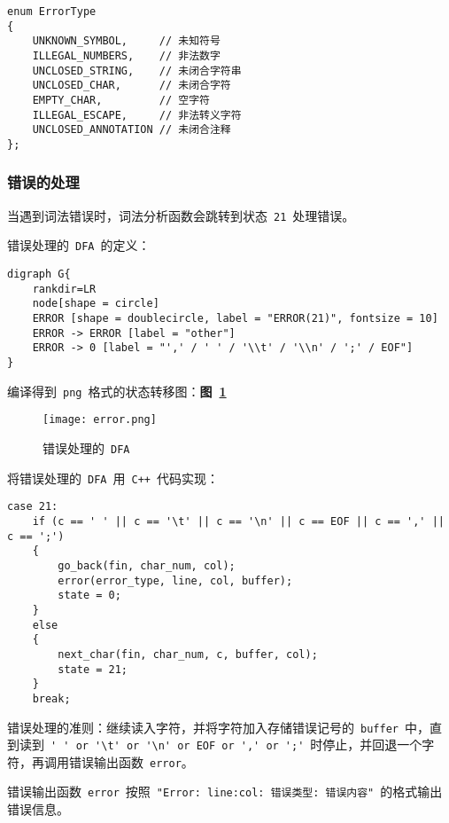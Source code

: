 \documentclass[lang=cn,11pt,a4paper]{paper}
\begin{document}
\begin{lstlisting}
enum ErrorType
{
    UNKNOWN_SYMBOL,     // 未知符号
    ILLEGAL_NUMBERS,    // 非法数字
    UNCLOSED_STRING,    // 未闭合字符串
    UNCLOSED_CHAR,      // 未闭合字符
    EMPTY_CHAR,         // 空字符
    ILLEGAL_ESCAPE,     // 非法转义字符
    UNCLOSED_ANNOTATION // 未闭合注释
};
\end{lstlisting}

\subsubsection{错误的处理}

当遇到词法错误时，词法分析函数会跳转到状态\ \lstinline{21}\ 处理错误。

错误处理的\ \lstinline{DFA}\ 的定义：
\begin{lstlisting}
digraph G{
    rankdir=LR
    node[shape = circle]
    ERROR [shape = doublecircle, label = "ERROR(21)", fontsize = 10]
    ERROR -> ERROR [label = "other"]
    ERROR -> 0 [label = "',' / ' ' / '\\t' / '\\n' / ';' / EOF"]
}
\end{lstlisting}

编译得到\ \lstinline{png}\ 格式的状态转移图：\textbf{图\ \ref{fig:错误处理的的DFA}}

\begin{figure}[!htb]
    \centering
    \texttt{[image: error.png]}
    \caption{错误处理的\ \lstinline{DFA}}
    \label{fig:错误处理的的DFA}
\end{figure}

将错误处理的\ \lstinline{DFA}\ 用\ \lstinline{C++}\ 代码实现：
\begin{lstlisting}
case 21:
    if (c == ' ' || c == '\t' || c == '\n' || c == EOF || c == ',' || c == ';')
    {
        go_back(fin, char_num, col);
        error(error_type, line, col, buffer);
        state = 0;
    }
    else
    {
        next_char(fin, char_num, c, buffer, col);
        state = 21;
    }
    break;
\end{lstlisting}

错误处理的准则：继续读入字符，并将字符加入存储错误记号的\ \lstinline{buffer}\ 中，直到读到\ \lstinline{' ' or '\t' or '\n' or EOF or ',' or ';'}\ 时停止，并回退一个字符，再调用错误输出函数\ \lstinline{error}。

错误输出函数\ \lstinline{error}\ 按照\ \lstinline{"Error: line:col: 错误类型: 错误内容"}\ 的格式输出错误信息。
\end{document}
